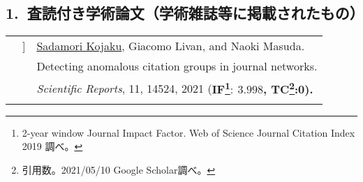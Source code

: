 \documentclass[letterpaper, 11pt]{article}
\newcounter{papercount}
\newcounter{papertype}
\newcommand{\paperitem}{%
\stepcounter{papercount}%
{\color{OliveGreen}{[\arabic{papertype}.\thepapercount}]}
}
\begin{document}
\subsection*{1.~査読付き学術論文（学術雑誌等に掲載されたもの）}
\begin{longtable}{p{0in}p{2em}p{7in}}
                                                    & \paperitem & \underline{Sadamori Kojaku}, Giacomo Livan, and Naoki Masuda.\\
                                                    & & Detecting anomalous citation groups in journal networks. \\
                                                    & & \textit{Scientific Reports}, 11, 14524, 2021 (\bf{IF}\footnote{2-year window Journal Impact Factor. Web of Science Journal Citation Index 2019 調べ。}$\bm{:~3.998}$, {\bf TC}\footnote{引用数。2021/05/10 Google Scholar調べ。}:0).\\
                                                    & \\


\end{longtable}
\end{document}
